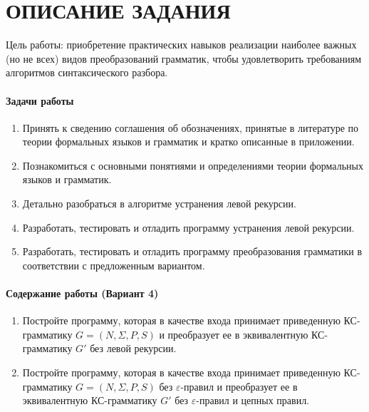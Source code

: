 \chapter*{ОПИСАНИЕ ЗАДАНИЯ}

Цель работы: приобретение практических навыков реализации наиболее важных (но не всех) видов
преобразований грамматик, чтобы удовлетворить требованиям алгоритмов синтаксического разбора.

\subsubsection*{Задачи работы}
\begin{enumerate}[label=\arabic*)]
	\item Принять к сведению соглашения об обозначениях, принятые в литературе по теории формальных языков и
	грамматик и кратко описанные в приложении.
	\item Познакомиться с основными понятиями и определениями теории формальных языков и грамматик.
	\item Детально разобраться в алгоритме устранения левой рекурсии.
	\item Разработать, тестировать и отладить программу устранения левой рекурсии.
	\item Разработать, тестировать и отладить программу преобразования грамматики в соответствии с
	предложенным вариантом.
\end{enumerate}

\subsubsection*{Содержание работы (Вариант 4)}

\begin{enumerate}
	\item Постройте программу, которая в качестве входа принимает приведенную КС-грамматику $G = (N, \Sigma, P, S)$ и преобразует ее в эквивалентную КС-грамматику $G'$ без левой рекурсии.
	\item Постройте программу, которая в качестве входа принимает приведенную КС-грамматику $G = (N, \Sigma, P, S)$ без $\varepsilon$-правил и преобразует ее в эквивалентную КС-грамматику $G'$ без $\varepsilon$-правил и цепных правил.
\end{enumerate}